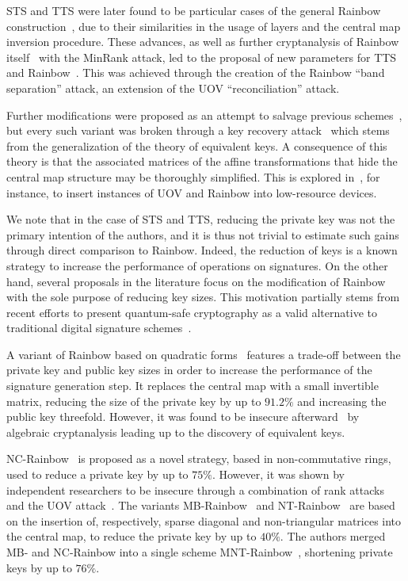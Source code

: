 \documentclass[12pt, a4paper, oneside]{memoir}
\theoremstyle{definition}
\begin{document}
STS and TTS were later found to be particular cases of the general Rainbow construction~\cite{Ding:200806}, due to their similarities in the usage of layers and the central map inversion procedure. These advances, as well as further cryptanalysis of Rainbow itself~\cite{Billet:200609} with the MinRank attack, led to the proposal of new parameters for TTS and Rainbow~\cite{Ding:200806}. This was achieved through the creation of the Rainbow ``band separation''  attack, an extension of the UOV ``reconciliation'' attack. 

Further modifications were proposed as an attempt to salvage previous schemes~\cite{Tsujii:201005}, but every such variant was broken through a key recovery attack~\cite{Thomae:201207} which stems from the generalization of the theory of equivalent keys. A consequence of this theory is that the associated matrices of the affine transformations that hide the central map structure may be thoroughly simplified. This is explored in~\cite{Czypek:201209}, for instance, to insert instances of UOV and Rainbow into low-resource devices.

We note that in the case of STS and TTS, reducing the private key was not the primary intention of the authors, and it is thus not trivial to estimate such gains through direct comparison to Rainbow. Indeed, the reduction of keys is a known strategy to increase the performance of operations on signatures. On the other hand, several proposals in the literature focus on the modification of Rainbow with the sole purpose of reducing key sizes. This motivation partially stems from recent efforts to present quantum-safe cryptography as a valid alternative to traditional digital signature schemes~\cite{Bernstein:2008}.

A variant of Rainbow based on quadratic forms~\cite{Yasuda:201306} features a trade-off between the private key and public key sizes in order to increase the performance of the signature generation step. It replaces the central map with a small invertible matrix, reducing the size of the private key by up to $91.2\%$ and increasing the public key threefold. However, it was found to be insecure afterward~\cite{Hashimoto:201601} by algebraic cryptanalysis leading up to the discovery of equivalent keys.

NC-Rainbow~\cite{Yasuda:201202} is proposed as a novel strategy, based in non-commutative rings, used to reduce a private key by up to $75\%$. However, it was shown by independent researchers to be insecure through a combination of rank attacks and the UOV attack~\cite{Thomae:201209,Hashimoto:201501}. The variants MB-Rainbow~\cite{Yasuda:201305} and NT-Rainbow~\cite{Yasuda:201404} are based on the insertion of, respectively, sparse diagonal and non-triangular matrices into the central map, to reduce the private key by up to $40\%$. The authors merged MB- and NC-Rainbow into a single scheme MNT-Rainbow~\cite{Yasuda:201409}, shortening private keys by up to $76\%$. 
\end{document}
